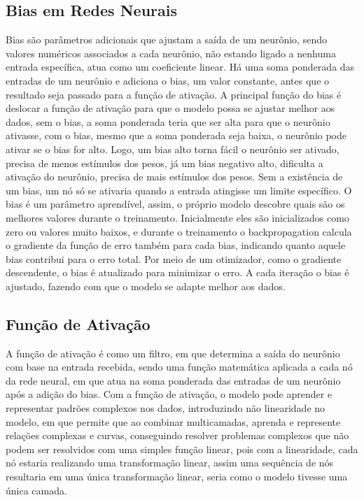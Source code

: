 \subsection{Bias em Redes Neurais}
Bias são parâmetros adicionais que ajustam a saída de um neurônio, sendo valores numéricos associados a cada neurônio, não estando ligado a nenhuma entrada específica, atua como um coeficiente linear.
Há uma soma ponderada das entradas de um neurônio e adiciona o bias, um valor constante, antes que o resultado seja passado para a função de ativação.
A principal função do bias é deslocar a função de ativação para que o modelo possa se ajustar melhor aos dados, sem o bias, a soma ponderada teria que ser alta para que o neurônio ativasse, com o bias, mesmo que a soma ponderada seja baixa, o neurônio pode ativar se o bias for alto. Logo, um bias alto torna fácil o neurônio ser ativado, precisa de menos estímulos dos pesos, já um bias negativo alto, dificulta a ativação do neurônio, precisa de mais estímulos dos pesos. Sem a existência de um bias, um nó só se ativaria quando a entrada atingisse um limite específico.
O bias é um parâmetro aprendível, assim, o próprio modelo descobre quais são os melhores valores durante o treinamento. Inicialmente eles são inicializados como zero ou valores muito baixos, e durante o treinamento o backpropagation calcula o gradiente da função de erro também para cada bias, indicando quanto aquele bias contribui para o erro total. Por meio de um otimizador, como o gradiente descendente, o bias é atualizado para minimizar o erro. A cada iteração o bias é ajustado, fazendo com que o modelo se adapte melhor aos dados.

\subsection{Função de Ativação}
A função de ativação é como um filtro, em que determina a saída do neurônio com base na entrada recebida, sendo uma função matemática aplicada a cada nó da rede neural, em que atua na soma ponderada das entradas de um neurônio após a adição do bias.
Com a função de ativação, o modelo pode aprender e representar padrões complexos nos dados, introduzindo não linearidade no modelo, em que permite que ao combinar multicamadas, aprenda e represente relações complexas e curvas, conseguindo resolver problemas complexos que não podem ser resolvidos com uma simples função linear, pois com a linearidade, cada nó estaria realizando uma transformação linear, assim uma sequência de nós resultaria em uma única transformação linear, seria como o modelo tivesse uma única camada.

